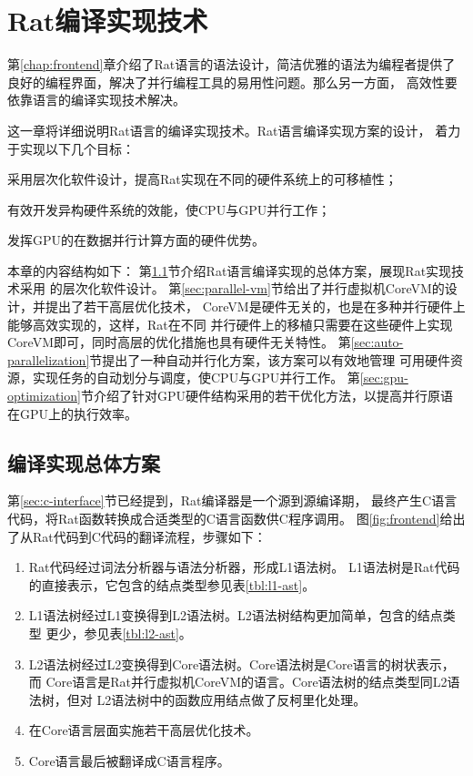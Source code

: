 \chapter{Rat编译实现技术}
第\ref{chap:frontend}章介绍了Rat语言的语法设计，简洁优雅的语法为编程者提供了
良好的编程界面，解决了并行编程工具的易用性问题。那么另一方面，
高效性要依靠语言的编译实现技术解决。

这一章将详细说明Rat语言的编译实现技术。Rat语言编译实现方案的设计，
着力于实现以下几个目标：
\begin{compactitem}
  \item 采用层次化软件设计，提高Rat实现在不同的硬件系统上的可移植性；
  \item 有效开发异构硬件系统的效能，使CPU与GPU并行工作；
  \item 发挥GPU的在数据并行计算方面的硬件优势。
\end{compactitem}

本章的内容结构如下：
第\ref{sec:backend-overview}节介绍Rat语言编译实现的总体方案，展现Rat实现技术采用
的层次化软件设计。
第\ref{sec:parallel-vm}节给出了并行虚拟机CoreVM的设计，并提出了若干高层优化技术，
CoreVM是硬件无关的，也是在多种并行硬件上能够高效实现的，这样，Rat在不同
并行硬件上的移植只需要在这些硬件上实现CoreVM即可，同时高层的优化措施也具有硬件无关特性。
第\ref{sec:auto-parallelization}节提出了一种自动并行化方案，该方案可以有效地管理
可用硬件资源，实现任务的自动划分与调度，使CPU与GPU并行工作。
第\ref{sec:gpu-optimization}节介绍了针对GPU硬件结构采用的若干优化方法，以提高并行原语
在GPU上的执行效率。

\section{编译实现总体方案}\label{sec:backend-overview}
第\ref{sec:c-interface}节已经提到，Rat编译器是一个源到源编译期，
最终产生C语言代码，将Rat函数转换成合适类型的C语言函数供C程序调用。
图\ref{fig:frontend}给出了从Rat代码到C代码的翻译流程，步骤如下：
\begin{enumerate}
  \item Rat代码经过词法分析器与语法分析器，形成L1语法树。
    L1语法树是Rat代码的直接表示，它包含的结点类型参见表\ref{tbl:l1-ast}。
  \item L1语法树经过L1变换得到L2语法树。L2语法树结构更加简单，包含的结点类型
    更少，参见表\ref{tbl:l2-ast}。
  \item L2语法树经过L2变换得到Core语法树。Core语法树是Core语言的树状表示，而
    Core语言是Rat并行虚拟机CoreVM的语言。Core语法树的结点类型同L2语法树，但对
    L2语法树中的函数应用结点做了反柯里化处理。
  \item 在Core语言层面实施若干高层优化技术。
  \item Core语言最后被翻译成C语言程序。
\end{enumerate}

